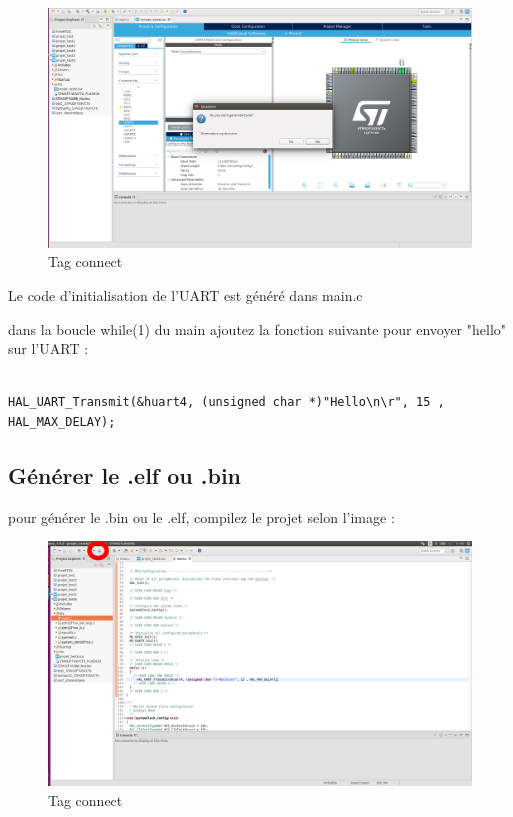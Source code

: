 \documentclass{article}
\begin{document}
\begin{figure}[H]
\begin{center}
\advance\leftskip-3cm
\advance\rightskip-3cm
\includegraphics[keepaspectratio=true,scale=0.3]{do_you_wanttogeneratecode.png}
\caption{Tag connect}
\label{visina8}
\end{center}\end{figure}

Le code d'initialisation de l'UART est généré dans main.c

dans la boucle while(1) du main ajoutez la fonction suivante pour envoyer "hello" sur l'UART :
\begin{verbatim}

HAL_UART_Transmit(&huart4, (unsigned char *)"Hello\n\r", 15 , HAL_MAX_DELAY);

\end{verbatim}

\subsection{Générer le .elf ou .bin}

pour générer le .bin ou le .elf, compilez le projet selon l'image :

\begin{figure}[H]
\begin{center}
\advance\leftskip-3cm
\advance\rightskip-3cm
\includegraphics[keepaspectratio=true,scale=0.3]{build_all.png}
\caption{Tag connect}
\label{visina8}
\end{center}\end{figure}
\end{document}
